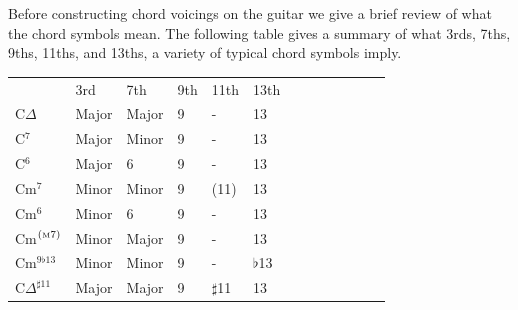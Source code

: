 \documentclass[12pt]{article}
\theoremstyle{definition}
\begin{document}
Before constructing chord voicings on the guitar we give a brief review of what the chord symbols mean. The following table gives a summary of what 3rds, 7ths, 9ths, 11ths, and 13ths, a variety of typical chord symbols imply. 

\begin{center}
\begin{tabular}{lllllllllllll}
\cline{1-6}
\multicolumn{1}{|l|}{}                          & \multicolumn{1}{l|}{3rd}   & \multicolumn{1}{l|}{7th}   & \multicolumn{1}{l|}{9th} & \multicolumn{1}{l|}{11th}       & \multicolumn{1}{l|}{13th}      &  &  &  &  &  &  &  \\ \cline{1-6}
\multicolumn{1}{|l|}{C$\Delta$}                 & \multicolumn{1}{l|}{Major} & \multicolumn{1}{l|}{Major} & \multicolumn{1}{l|}{9}   & \multicolumn{1}{l|}{-}          & \multicolumn{1}{l|}{13}        &  &  &  &  &  &  &  \\ \cline{1-6}
\multicolumn{1}{|l|}{C$^7$}                     & \multicolumn{1}{l|}{Major} & \multicolumn{1}{l|}{Minor} & \multicolumn{1}{l|}{9}   & \multicolumn{1}{l|}{-}          & \multicolumn{1}{l|}{13}        &  &  &  &  &  &  &  \\ \cline{1-6}
\multicolumn{1}{|l|}{C$^6$}                     & \multicolumn{1}{l|}{Major} & \multicolumn{1}{l|}{6}     & \multicolumn{1}{l|}{9}   & \multicolumn{1}{l|}{-}          & \multicolumn{1}{l|}{13}        &  &  &  &  &  &  &  \\ \cline{1-6}
\multicolumn{1}{|l|}{Cm$^7$}                    & \multicolumn{1}{l|}{Minor} & \multicolumn{1}{l|}{Minor} & \multicolumn{1}{l|}{9}   & \multicolumn{1}{l|}{(11)}       & \multicolumn{1}{l|}{13}        &  &  &  &  &  &  &  \\ \cline{1-6}
\multicolumn{1}{|l|}{Cm$^6$}                    & \multicolumn{1}{l|}{Minor} & \multicolumn{1}{l|}{6}     & \multicolumn{1}{l|}{9}   & \multicolumn{1}{l|}{-}          & \multicolumn{1}{l|}{13}        &  &  &  &  &  &  &  \\ \cline{1-6}
\multicolumn{1}{|l|}{Cm$^{(\textrm{\tiny M} 7)}$} & \multicolumn{1}{l|}{Minor} & \multicolumn{1}{l|}{Major} & \multicolumn{1}{l|}{9}   & \multicolumn{1}{l|}{-}          & \multicolumn{1}{l|}{13}        &  &  &  &  &  &  &  \\ \cline{1-6}
\multicolumn{1}{|l|}{Cm$^{9\flat 13}$}          & \multicolumn{1}{l|}{Minor} & \multicolumn{1}{l|}{Minor} & \multicolumn{1}{l|}{9}   & \multicolumn{1}{l|}{-}          & \multicolumn{1}{l|}{$\flat$13} &  &  &  &  &  &  &  \\ \cline{1-6}
\multicolumn{1}{|l|}{C$\Delta^{\sharp 11}$}     & \multicolumn{1}{l|}{Major} & \multicolumn{1}{l|}{Major} & \multicolumn{1}{l|}{9}   & \multicolumn{1}{l|}{$\sharp$11} & \multicolumn{1}{l|}{13}        &  &  &  &  &  &  &  \\ \cline{1-6}

\end{tabular}
\end{center}
\end{document}
